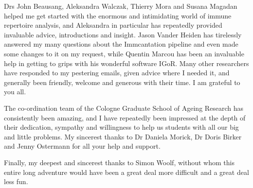 \begin{acknowledgements}
Drs John Beausang, Aleksandra Walczak, Thierry Mora and Susana Magadan helped me get started with the enormous and intimidating world of immune repertoire analysis, and Aleksandra in particular has repeatedly provided invaluable advice, introductions and insight. Jason Vander Heiden has tirelessly answered my many questions about the Immcantation pipeline and even made some changes to it on my request, while Quentin Marcou has been an invaluable help in getting to grips with his wonderful software IGoR. Many other researchers have responded to my pestering emails, given advice where I needed it, and generally been friendly, welcome and generous with their time. I am grateful to you all.

The co-ordination team of the Cologne Graduate School of Ageing Research has consistently been amazing, and I have repeatedly been impressed at the depth of their dedication, sympathy and willingness to help us students with all our big and little problems. My sincerest thanks to Dr Daniela Morick, Dr Doris Birker and Jenny Ostermann for all your help and support.


Finally, my deepest and sincerest thanks to Simon Woolf, without whom this entire long adventure would have been a great deal more difficult and a great deal less fun.


\end{acknowledgements}
